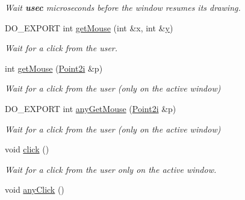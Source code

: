 \begin{DoxyCompactItemize}
\begin{DoxyCompactList}\small\item\em Wait {\bfseries usec} microseconds before the window resumes its drawing. \end{DoxyCompactList}\item 
D\-O\-\_\-\-E\-X\-P\-O\-R\-T int \hyperlink{group___window_management_ga5f65aa168357a4f932ac14bf3767af4f}{get\-Mouse} (int \&x, int \&\hyperlink{group___channel_accessors_gac90c52c5b3a7b2a7e3761e6e84f25778}{y})
\begin{DoxyCompactList}\small\item\em Wait for a click from the user. \end{DoxyCompactList}\item 
int \hyperlink{group___window_management_gaa1b23139f5681ebfe40610f79e70de4b}{get\-Mouse} (\hyperlink{group___eigen_typedefs_ga048a27763e58f682b1b91af86144f701}{Point2i} \&p)
\begin{DoxyCompactList}\small\item\em Wait for a click from the user (only on the {\itshape active} window) \end{DoxyCompactList}\item 
D\-O\-\_\-\-E\-X\-P\-O\-R\-T int \hyperlink{group___window_management_gac4b8452beab69863b0ccba5a91b55983}{any\-Get\-Mouse} (\hyperlink{group___eigen_typedefs_ga048a27763e58f682b1b91af86144f701}{Point2i} \&p)
\begin{DoxyCompactList}\small\item\em Wait for a click from the user (only on the {\itshape active} window) \end{DoxyCompactList}\item 
\hypertarget{group___window_management_ga8330275bee3034e337eaeed23e2e49bf}{void \hyperlink{group___window_management_ga8330275bee3034e337eaeed23e2e49bf}{click} ()}\label{group___window_management_ga8330275bee3034e337eaeed23e2e49bf}

\begin{DoxyCompactList}\small\item\em Wait for a click from the user only on the {\itshape active} window. \end{DoxyCompactList}\item 
\hypertarget{group___window_management_ga0fda113cb57d325acd796bbb3bffc1e0}{void \hyperlink{group___window_management_ga0fda113cb57d325acd796bbb3bffc1e0}{any\-Click} ()}\label{group___window_management_ga0fda113cb57d325acd796bbb3bffc1e0}


\end{DoxyCompactItemize}
